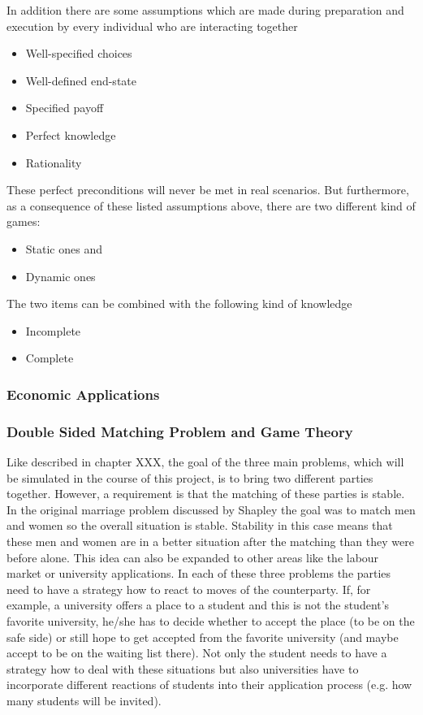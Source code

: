In addition there are some assumptions which are made during preparation and execution by every individual who are interacting together \cite {gibbons1997gametheory}
\begin{itemize}
	\item Well-specified choices
	\item Well-defined end-state
	\item Specified payoff
	\item Perfect knowledge
	\item Rationality 
\end{itemize}

These perfect preconditions will never be met in real scenarios. But furthermore, as a consequence of these listed assumptions above, there are two different kind of games:

\begin{itemize}
	\item Static ones and
	\item Dynamic ones
\end{itemize}

The two items can be combined with the following kind of knowledge

\begin{itemize}
	\item Incomplete
	\item Complete
\end{itemize}


\subsubsection{Economic Applications}

\subsubsection{Double Sided Matching Problem and Game Theory}

Like described in chapter XXX, the goal of the three main problems, which will be simulated in the course of this project, is to bring two different parties together. However, a requirement is that the matching of these parties is stable. In the original marriage problem discussed by Shapley the goal was to match men and women so the overall situation is stable. Stability in this case means that these men and women are in a better situation after the matching than they were before alone. 
This idea can also be expanded to other areas like the labour market or university applications. In each of these three problems the parties need to have a strategy how to react to moves of the counterparty. If, for example, a university offers a place to a student and this is not the student's favorite university,  he/she has to decide whether to accept the place (to be on the safe side) or still hope to get accepted from the favorite university (and maybe accept to be on the waiting list there). Not only the student needs to have a strategy how to deal with these situations but also universities have to incorporate different reactions of students into their application process (e.g. how many students will be invited). \cite {gale62a}

